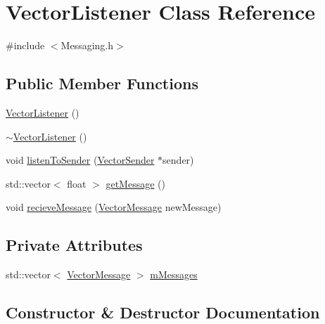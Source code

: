 \hypertarget{class_vector_listener}{}\section{Vector\+Listener Class Reference}
\label{class_vector_listener}


{\ttfamily \#include $<$Messaging.\+h$>$}

\subsection*{Public Member Functions}
\begin{DoxyCompactItemize}
\item 
\hyperlink{class_vector_listener_afca85f2ffecddf8a80c197f9600154c7}{Vector\+Listener} ()
\item 
\hyperlink{class_vector_listener_a7ac57a8e4d4cb46a77c6dbda4e113691}{$\sim$\+Vector\+Listener} ()
\item 
void \hyperlink{class_vector_listener_a6f4f7461d4ed43d0e7cd0c548f006eb9}{listen\+To\+Sender} (\hyperlink{class_vector_sender}{Vector\+Sender} $\ast$sender)
\item 
std\+::vector$<$ float $>$ \hyperlink{class_vector_listener_af1625cc18b4fed20d9aa07a7b30f1baa}{get\+Message} ()
\item 
void \hyperlink{class_vector_listener_aa9df46e5a73a653f18ab42866a1ea4f5}{recieve\+Message} (\hyperlink{struct_vector_message}{Vector\+Message} new\+Message)
\end{DoxyCompactItemize}
\subsection*{Private Attributes}
\begin{DoxyCompactItemize}
\item 
std\+::vector$<$ \hyperlink{struct_vector_message}{Vector\+Message} $>$ \hyperlink{class_vector_listener_ab54f0ab73d1c32b9365d79a502de7ea1}{m\+Messages}
\end{DoxyCompactItemize}


\subsection{Constructor \& Destructor Documentation}
\mbox{\label{class_vector_listener_afca85f2ffecddf8a80c197f9600154c7}} 
